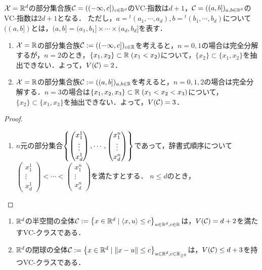 \documentclass[uplatex,dvipdfmx]{jsreport}
\begin{document}
\begin{example}
    $\mathcal{X}=\mathbb{R}^d$の部分集合族$\mathcal{C}=((-\infty,c])_{c\in\mathbb{R}^d}$のVC-指数は$d+1$，$\mathcal{C}=((a,b])_{a,b\in\mathbb{R}^d}$のVC-指数は$2d+1$となる．
    ただし，$a={}^t\!(a_1,\cdots,a_d),b={}^t\!(b_1,\cdots,b_d)$について$((a,b])$とは，$(a,b]=(a_1,b_1]\times\cdots\times(a_d,b_d]$を表す．
    \begin{enumerate}
        \item $\mathcal{X}=\mathbb{R}$の部分集合族$\mathcal{C}:=((-\infty,c])_{c\in\mathbb{R}}$を考えると，$n=0,1$の場合は完全分解するが，$n=2$のとき，$\{x_1,x_2\}\subset\mathbb{R}\;(x_1<x_2)$について，$\{x_2\}\subset\{x_1,x_2\}$を抽出できない．よって，$V(\mathcal{C})=2$．
        \item $\mathcal{X}=\mathbb{R}$の部分集合族$\mathcal{C}:=((a,b])_{a,b\in\mathbb{R}}$を考えると，$n=0,1,2$の場合は完全分解する．$n=3$の場合は$\{x_1,x_2,x_3\}\subset\mathbb{R}\;(x_1<x_2<x_3)$について，$\{x_2\}\subset\{x_1,x_3\}$を抽出できない．よって，$V(\mathcal{C})=3$．
    \end{enumerate}
\end{example}
\begin{proof}\mbox{}
    \begin{enumerate}
        \item $n$元の部分集合$\left\{\begin{pmatrix}x_1^1\\\vdots\\x_d^1\end{pmatrix},\cdots,\begin{pmatrix}x_1^n\\\vdots\\x_d^n\end{pmatrix}\right\}$であって，辞書式順序について$\begin{pmatrix}x_1^1\\\vdots\\x_d^1\end{pmatrix}<\cdots<\begin{pmatrix}x_1^n\\\vdots\\x_d^n\end{pmatrix}$を満たすとする．
        $n\le d$のとき，
    \end{enumerate}
\end{proof}

\begin{example}\mbox{}
    \begin{enumerate}
        \item $\mathbb{R}^d$の半空間の全体$\mathcal{C}:=\left\{x\in\mathbb{R}^d\mid\langle x,u\rangle\le c\right\}_{u\in\mathbb{R}^d,c\in\mathbb{R}}$は，$V(\mathcal{C})=d+2$を満たすVC-クラスである．
        \item $\mathbb{R}^d$の閉球の全体$\mathcal{C}:=\left\{x\in\mathbb{R}^d\mid\|x-u\|\le c\right\}_{u\in\mathbb{R}^d,c\in\mathbb{R}_{\ge0}}$は，$V(\mathcal{C})\le d+3$を持つVC-クラスである．
    \end{enumerate}
\end{example}
\end{document}
